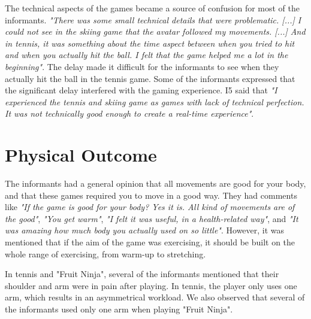 The technical aspects of the games became a source of confusion for most of the informants. \emph{"There was some small technical details that were problematic. [...] I could not see in the skiing game that the avatar followed my movements. [...] And in tennis, it was something about the time aspect between when you tried to hit and when you actually hit the ball. I felt that the game helped me a lot in the beginning"}. The delay made it difficult for the informants to see when they actually hit the ball in the tennis game. Some of the informants expressed that the significant delay interfered with the gaming experience. I5 said that \emph{"I experienced the tennis and skiing game as games with lack of technical perfection. It was not technically good enough to create a real-time experience"}. 

\section{Physical Outcome}

The informants had a general opinion that all movements are good for your body, and that these games required you to move in a good way. They had comments like \emph{"If the game is good for your body? Yes it is. All kind of movements are of the good"}, \emph{"You get warm"}, \emph{"I felt it was useful, in a health-related way"}, and \emph{"It was amazing how much body you actually used on so little"}. However, it was mentioned that if the aim of the game was exercising, it should be built on the whole range of exercising, from warm-up to stretching. 

In tennis and "Fruit Ninja", several of the informants mentioned that their shoulder and arm were in pain after playing. In tennis, the player only uses one arm, which results in an asymmetrical workload. We also observed that several of the informants used only one arm when playing "Fruit Ninja".
    
